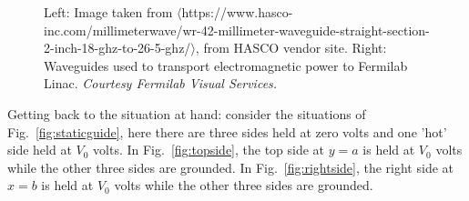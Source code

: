 \documentclass[12pt]{article}
\begin{document}
\begin{flushleft}
\begin{figure}[h]
\begin{center}
\hspace{0.1in}
\end{center}
\caption{\small Left: Image taken from $\langle$https://www.hasco-inc.com/millimeterwave/wr-42-millimeter-waveguide-straight-section-2-inch-18-ghz-to-26-5-ghz/$\rangle$, from HASCO vendor site.  Right: Waveguides used to transport electromagnetic power to Fermilab Linac. \textit{Courtesy Fermilab Visual Services.}}
\label{fig:realguides}
\end{figure}

Getting back to the situation at hand: consider the situations of Fig.~\ref{fig:staticguide}, here there are three sides held at zero volts and one 'hot' side held at $V_{0}$ volts.  In Fig.~\ref{fig:topside}, the top side at $y=a$ is held at $V_{0}$ volts while the other three sides are grounded.  In Fig.~\ref{fig:rightside}, the right side at $x=b$ is held at $V_{0}$ volts while the other three sides are grounded.


\end{flushleft}
\end{document}
